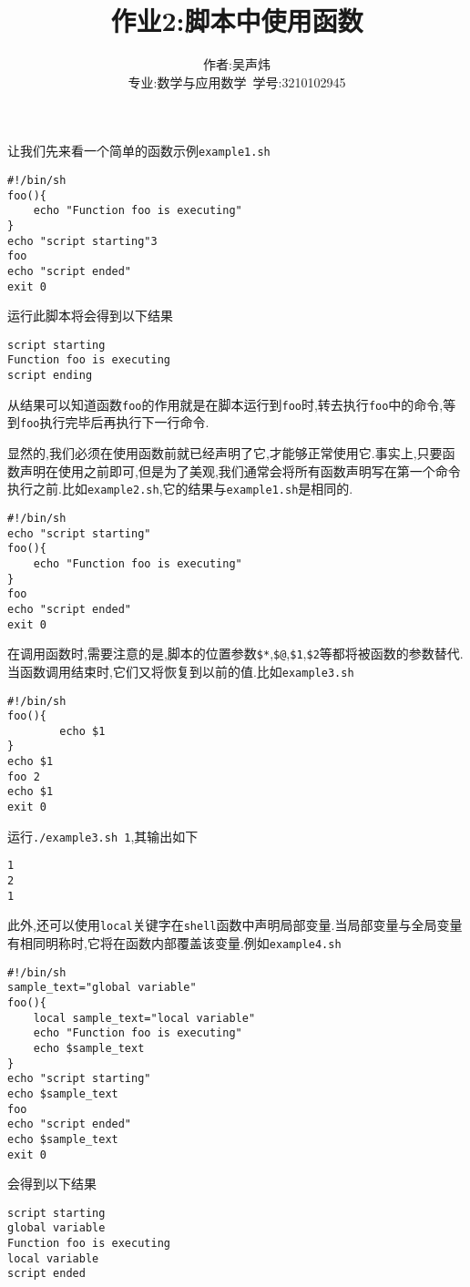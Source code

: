 \documentclass{ctexart}
\title{作业2:脚本中使用函数}
\author{作者:吴声炜\\专业:数学与应用数学\ 学号:3210102945}
\begin{document}
\maketitle

让我们先来看一个简单的函数示例\verb|example1.sh|

\begin{verbatim}
#!/bin/sh
foo(){
    echo "Function foo is executing"
}
echo "script starting"3
foo
echo "script ended"
exit 0    
\end{verbatim}

运行此脚本将会得到以下结果

\begin{verbatim}
script starting
Function foo is executing
script ending
\end{verbatim}

从结果可以知道函数\verb|foo|的作用就是在脚本运行到\verb|foo|时,转去执行\verb|foo|中的命令,等到\verb|foo|执行完毕后再执行下一行命令.

显然的,我们必须在使用函数前就已经声明了它,才能够正常使用它.事实上,只要函数声明在使用之前即可,但是为了美观,我们通常会将所有函数声明写在第一个命令执行之前.比如\verb|example2.sh|,它的结果与\verb|example1.sh|是相同的.

\begin{verbatim}
#!/bin/sh
echo "script starting"
foo(){
    echo "Function foo is executing"
}
foo
echo "script ended"
exit 0
\end{verbatim}

在调用函数时,需要注意的是,脚本的位置参数\verb|$*|,\verb|$@|,\verb|$1|,\verb|$2|等都将被函数的参数替代.当函数调用结束时,它们又将恢复到以前的值.比如\verb|example3.sh|

\begin{verbatim}
#!/bin/sh
foo(){
        echo $1
}
echo $1
foo 2
echo $1
exit 0
\end{verbatim}

运行\verb|./example3.sh 1|,其输出如下

\begin{verbatim}
1
2
1
\end{verbatim}

此外,还可以使用\verb|local|关键字在\verb|shell|函数中声明局部变量.当局部变量与全局变量有相同明称时,它将在函数内部覆盖该变量.例如\verb|example4.sh|

\begin{verbatim}
#!/bin/sh
sample_text="global variable"
foo(){
    local sample_text="local variable"
    echo "Function foo is executing"
    echo $sample_text
}
echo "script starting"
echo $sample_text
foo
echo "script ended"
echo $sample_text
exit 0
\end{verbatim}

会得到以下结果

\begin{verbatim}
script starting
global variable
Function foo is executing
local variable
script ended
\end{verbatim}
\end{document}
